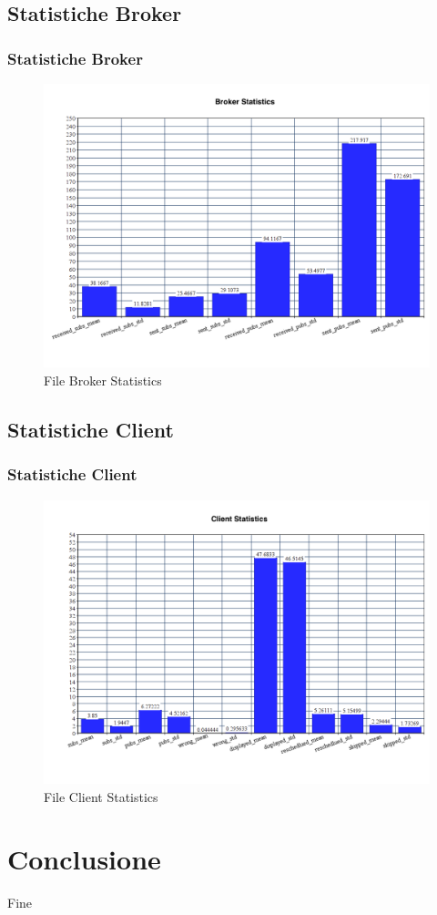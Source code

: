 \documentclass{beamer}
\begin{document}
\subsection{Statistiche Broker}
\begin{frame}
	\frametitle{Statistiche Broker}
	
	\begin{figure}[h!]
		\centering
		\includegraphics{Risorse/broker_stats.png} %
		\caption{File Broker Statistics}
	\end{figure}
	
\end{frame}

\subsection{Statistiche Client}
\begin{frame}
	\frametitle{Statistiche Client}
	
	\begin{figure}[h!]
		\centering
		\includegraphics{Risorse/client_stats.png} %
		\caption{File Client Statistics}
	\end{figure}
	
\end{frame}

\section{Conclusione}
\begin{frame}
	\Huge{\centerline{Fine}}
\end{frame}

\end{document}
